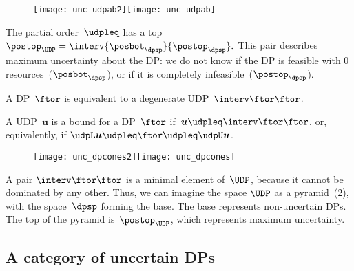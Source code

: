 \begin{figure}[h!]
    \texttt{[image: unc\_udpab2]}\texttt{[image: unc\_udpab]}
    \caption{}
    \label{fig:udpspace}
\end{figure}

The partial order~$\udpleq$ has a top~$\postop_{\UDP}=\interv {\posbot_{\dpsp}} {\postop_{\dpsp}}.
$
This pair describes maximum uncertainty about the DP: we do not know
if the DP is feasible with 0 resources~($\posbot_{\dpsp}$), or if it
is completely infeasible~($\postop_{\dpsp}$).

A DP~$\ftor$ is equivalent to a degenerate UDP~$\interv\ftor\ftor$.

A UDP~$\boldsymbol{u}$ is a bound for a DP~$\ftor$ if~$\boldsymbol{u}\udpleq\interv\ftor\ftor$,
or, equivalently, if $\udpL\boldsymbol{u}\udpleq\ftor\udpleq\udpU\boldsymbol{u}$.

\begin{figure}[h!]
    \texttt{[image: unc\_dpcones2]}\texttt{[image: unc\_dpcones]}
    \caption{}
    \label{fig:pyr1}
\end{figure}

A pair $\interv\ftor\ftor$ is a minimal element of~$\UDP$, because it cannot be dominated by any other.
Thus, we can imagine the space $\UDP$ as a pyramid~(\cref{fig:pyr1}), with the space~$\dpsp$ forming the base.
The base represents non-uncertain DPs.
The top of the pyramid is~$\postop_{\UDP}$, which represents maximum uncertainty.

%
%

\subsection{A category of uncertain DPs}

